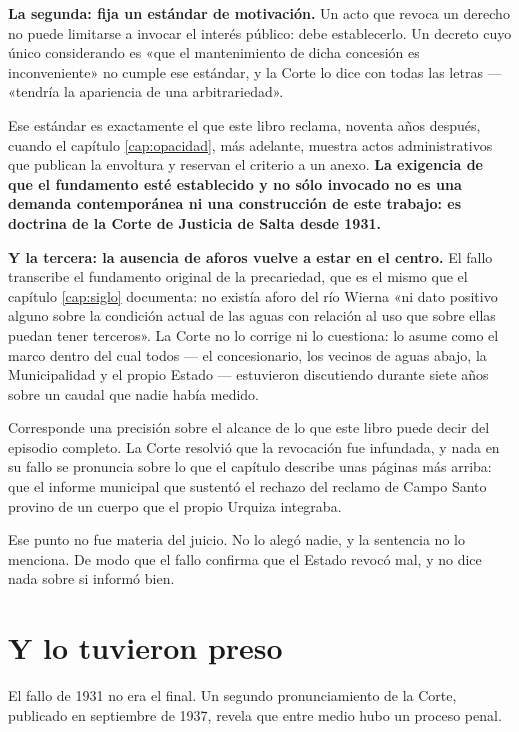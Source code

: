 \textbf{La segunda: fija un estándar de motivación.} Un acto que revoca un derecho no puede
limitarse a invocar el interés público: debe establecerlo. Un decreto cuyo único considerando
es «que el mantenimiento de dicha concesión es inconveniente» no cumple ese estándar, y la
Corte lo dice con todas las letras --- «tendría la apariencia de una arbitrariedad».

Ese estándar es exactamente el que este libro reclama, noventa años después, cuando el
capítulo \ref{cap:opacidad}, más adelante, muestra actos administrativos que publican la envoltura y reservan el criterio a
un anexo. \textbf{La exigencia de que el fundamento esté establecido y no sólo invocado no
es una demanda contemporánea ni una construcción de este trabajo: es doctrina de la Corte de
Justicia de Salta desde 1931.}

\textbf{Y la tercera: la ausencia de aforos vuelve a estar en el centro.} El fallo transcribe
el fundamento original de la precariedad, que es el mismo que el capítulo \ref{cap:siglo} documenta: no
existía aforo del río Wierna «ni dato positivo alguno sobre la condición actual de las aguas
con relación al uso que sobre ellas puedan tener terceros». La Corte no lo corrige ni lo
cuestiona: lo asume como el marco dentro del cual todos --- el concesionario, los vecinos de
aguas abajo, la Municipalidad y el propio Estado --- estuvieron discutiendo durante siete
años sobre un caudal que nadie había medido.

\begin{cautela}
Corresponde una precisión sobre el alcance de lo que este libro puede decir del episodio
completo. La Corte resolvió que la revocación fue infundada, y nada en su fallo se pronuncia
sobre lo que el capítulo describe unas páginas más arriba: que el informe municipal que
sustentó el rechazo del reclamo de Campo Santo provino de un cuerpo que el propio Urquiza
integraba.

Ese punto no fue materia del juicio. No lo alegó nadie, y la sentencia no lo menciona. De
modo que el fallo confirma que el Estado revocó mal, y no dice nada sobre si informó bien.
\end{cautela}

\section{Y lo tuvieron preso}

El fallo de 1931 no era el final. Un segundo pronunciamiento de la Corte, publicado en
septiembre de 1937, revela que entre medio hubo un proceso penal.

